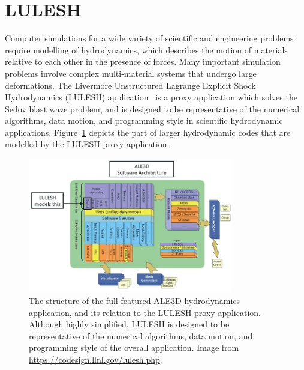 \section{LULESH}

Computer simulations for a wide variety of scientific and engineering problems
require modelling of hydrodynamics, which describes the motion of materials
relative to each other in the presence of forces. Many important simulation
problems involve complex multi-material systems that undergo large deformations.
The Livermore Unstructured Lagrange Explicit Shock Hydrodynamics (LULESH)
application~\cite{LULESH:spec,Karlin:2012us,Karlin:2013ux} is a proxy
application which solves the Sedov blast wave problem, and is designed to be
representative of the numerical algorithms, data motion, and programming style
in scientific hydrodynamic applications.
%
Figure~\ref{fig:ale3d} depicts the part of larger hydrodynamic codes that are
modelled by the LULESH proxy application.

\begin{figure}
    \centering
    \includegraphics[width=0.8\textwidth]{images/results/lulesh/ale3d}
    \caption[Software architecture of hydrodynamics applications]{The structure
        of the full-featured ALE3D hydrodynamics application, and its relation
        to the LULESH proxy application. Although highly simplified, LULESH is
        designed to be representative of the numerical algorithms, data motion,
        and programming style of the overall application. Image from
        \url{https://codesign.llnl.gov/lulesh.php}.}
    \label{fig:ale3d}
\end{figure}

